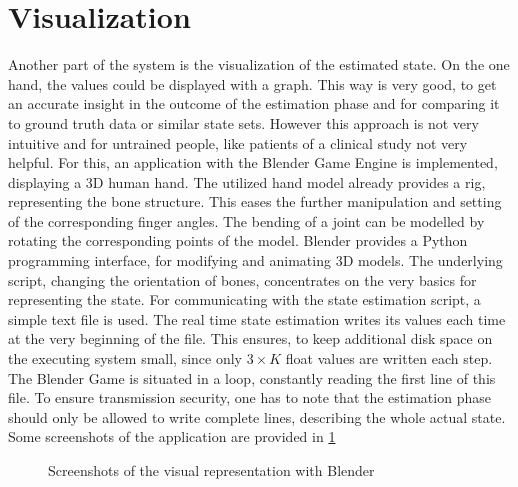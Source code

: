 \section{Visualization} \label{sec:visual}

Another part of the system is the visualization of the estimated state. On the one hand, the values could be displayed with a graph. This way is very good, to get an accurate insight in the outcome of the estimation phase and for comparing it to ground truth data or similar state sets. However this approach is not very intuitive and for untrained people, like patients of a clinical study not very helpful. For this, an application with the Blender Game Engine \cite{blender} is implemented, displaying a 3D human hand. The utilized hand model already provides a rig, representing the bone structure. This eases the further manipulation and setting of the corresponding finger angles. The bending of a joint can be modelled by rotating the corresponding points of the model. Blender provides a Python programming interface, for modifying and animating 3D models. The underlying script, changing the orientation of bones, concentrates on the very basics for representing the state. For communicating with the state estimation script, a simple text file is used. The real time state estimation writes its values each time at the very beginning of the file. This ensures, to keep additional disk space on the executing system small, since only $ 3 \times K $ float values are written each step. The Blender Game is situated in a loop, constantly reading the first line of this file. To ensure transmission security, one has to note that the estimation phase should only be allowed to write complete lines, describing the whole actual state. Some screenshots of the application are provided in \ref{fig:blendGame}

\begin{figure}[h]
\centering
	\hfill
\caption{Screenshots of the visual representation with Blender}
\label{fig:blendGame}
\end{figure}
